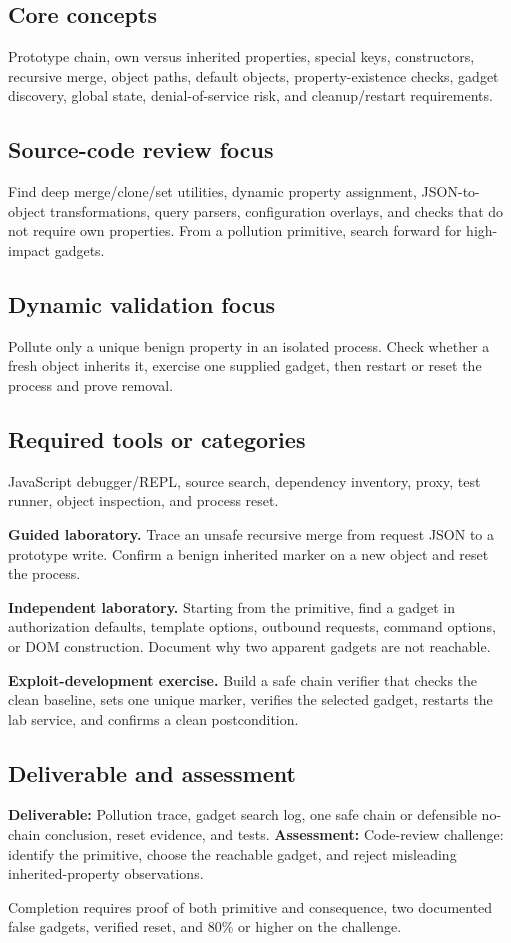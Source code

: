 \documentclass[11pt]{article}
\newcommand{\weekfield}[2]{%
  \Needspace{5\baselineskip}
  \subsection*{#1}
  #2
}
\newcommand{\deliverable}[1]{\textbf{Deliverable:} #1}
\newcommand{\assessment}[1]{\textbf{Assessment:} #1}
\begin{document}
\weekfield{Core concepts}{Prototype chain, own versus inherited properties,
special keys, constructors, recursive merge, object paths, default objects,
property-existence checks, gadget discovery, global state, denial-of-service risk,
and cleanup/restart requirements.}

\weekfield{Source-code review focus}{Find deep merge/clone/set utilities, dynamic
property assignment, JSON-to-object transformations, query parsers, configuration
overlays, and checks that do not require own properties. From a pollution primitive,
search forward for high-impact gadgets.}

\weekfield{Dynamic validation focus}{Pollute only a unique benign property in an
isolated process. Check whether a fresh object inherits it, exercise one supplied
gadget, then restart or reset the process and prove removal.}

\weekfield{Required tools or categories}{JavaScript debugger/REPL, source search,
dependency inventory, proxy, test runner, object inspection, and process reset.}

\begin{labbox}
\textbf{Guided laboratory.} Trace an unsafe recursive merge from request JSON to
a prototype write. Confirm a benign inherited marker on a new object and reset
the process.

\textbf{Independent laboratory.} Starting from the primitive, find a gadget in
authorization defaults, template options, outbound requests, command options, or
DOM construction. Document why two apparent gadgets are not reachable.

\textbf{Exploit-development exercise.} Build a safe chain verifier that checks
the clean baseline, sets one unique marker, verifies the selected gadget, restarts
the lab service, and confirms a clean postcondition.
\end{labbox}

\weekfield{Deliverable and assessment}{\deliverable{Pollution trace, gadget search
log, one safe chain or defensible no-chain conclusion, reset evidence, and tests.}
\assessment{Code-review challenge: identify the primitive, choose the reachable
gadget, and reject misleading inherited-property observations.}}

\begin{checkpoints}
Completion requires proof of both primitive and consequence, two documented false
gadgets, verified reset, and 80\% or higher on the challenge.
\end{checkpoints}
\end{document}
